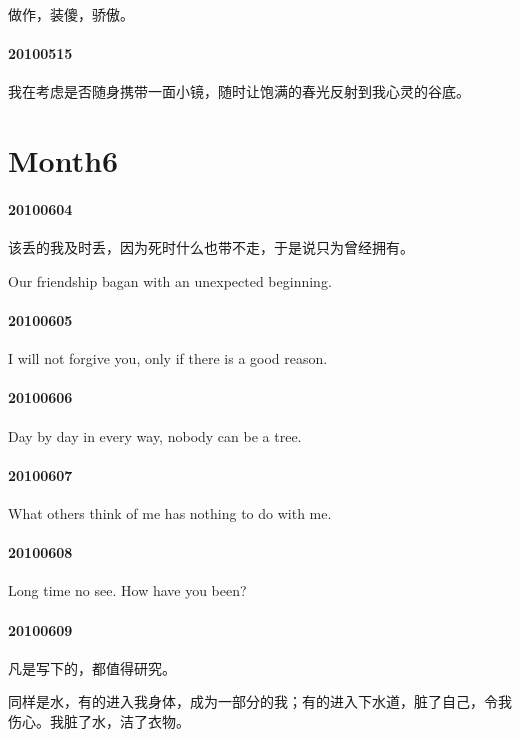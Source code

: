 \documentclass[UTF8]{Diaries}
\begin{document}
做作，装傻，骄傲。


\paragraph{20100515}

我在考虑是否随身携带一面小镜，随时让饱满的春光反射到我心灵的谷底。

\section{Month6}
\paragraph{20100604}

该丢的我及时丢，因为死时什么也带不走，于是说只为曾经拥有。

Our friendship bagan with an unexpected beginning.


\paragraph{20100605}

I will not forgive you, only if there is a good reason.


\paragraph{20100606}

Day by day in every way, nobody can be a tree.


\paragraph{20100607}

What others think of me has nothing to do with me.


\paragraph{20100608}

Long time no see. How have you been?


\paragraph{20100609}

凡是写下的，都值得研究。

同样是水，有的进入我身体，成为一部分的我；有的进入下水道，脏了自己，令我伤心。我脏了水，洁了衣物。
\end{document}
